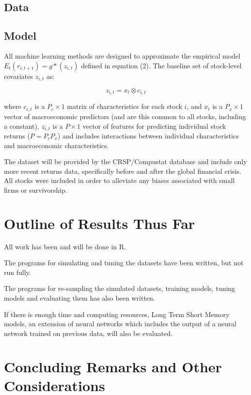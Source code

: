 \documentclass[a4paper]{article}
\newcommand{\smalltodo}[2][] {\todo[caption={#2}, size=\scriptsize,%
	fancyline,#1]{\begin{spacing}{.5}#2\end{spacing}}}
\newcommand{\rhs}[2][]{\smalltodo[color=green!30,#1]{{\bf RS:} #2}}
\begin{document}
	\subsection{Data}
	
	\rhs{Pending}
	
	\subsection{Model}
	
	All machine learning methods are designed to approximate the empirical model \( E_t(r_{i, t+1}) = g*(z_{i,t}) \) defined in equation (2). The baseline set of stock-level covariates \( z_{i,t} \) as:
	
	\begin{equation}
	z_{i,t} = x_t \otimes c_{i,t}
	\end{equation}
	
	where \( c_{i,t} \) is a \( P_c \times 1 \) matrix of characteristics for each stock \(i\), and \(x_t\) is a $P_x \times 1$ vector of macroeconomic predictors (and are this common to all stocks, including a constant). $z_{i,t}$ is a $P \times 1$ vector of features for predicting individual stock returns ($P = P_cP_x$) and includes interactions between individual characteristics and macroeconomic characteristics. 
	
	The dataset will be provided by the CRSP/Compustat database and include only more recent returns data, specifically before and after the global financial crisis. All stocks were included in order to alleviate any biases associated with small firms or survivorship.
	
	\section{Outline of Results Thus Far}
	
	All work has been and will be done in R.
	
	The programs for simulating and tuning the datasets have been written, but not run fully.
	
	The programs for re-sampling the simulated datasets, training models, tuning models and evaluating them has also been written.
	
	If there is enough time and computing resources, Long Term Short Memory models, an extension of neural networks which includes the output of a neural network trained on previous data, will also be evaluated.
	
	\section{Concluding Remarks and Other Considerations}
	
\end{document}
